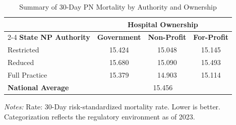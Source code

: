 \begin{table}[htbp]
    \centering
    \caption{Summary of 30-Day PN Mortality by Authority and Ownership}
    \label{tab:mortality_rate_pn_own}
    \vspace{0.2cm}
    \begin{tabular}{lccc}
        \toprule
        & \multicolumn{3}{c}{\textbf{Hospital Ownership}} \\
        \cmidrule(lr){2-4}
        \textbf{State NP Authority} & \textbf{Government} & \textbf{Non-Profit} & \textbf{For-Profit} \\
        \midrule
        Restricted & 15.424 & 15.048 & 15.145 \\
        Reduced & 15.680 & 15.090 & 15.493 \\
        Full Practice & 15.379 & 14.903 & 15.114 \\
        \midrule
        \textbf{National Average} & \multicolumn{3}{c}{15.456} \\
        \bottomrule
    \end{tabular}
    \vspace{0.1cm}
    \begin{minipage}{0.85\textwidth}
        \footnotesize \textit{Notes:} Rate: 30-Day risk-standardized mortality rate. Lower is better. Categorization reflects the regulatory environment as of 2023.
    \end{minipage}
\end{table}